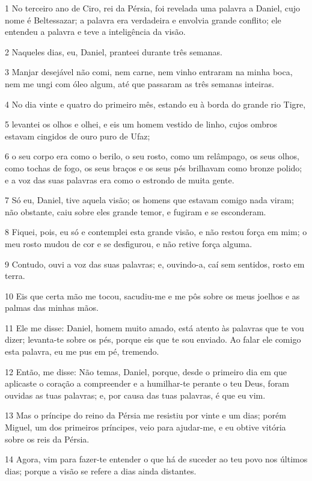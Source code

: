 \par 1 No terceiro ano de Ciro, rei da Pérsia, foi revelada uma palavra a Daniel, cujo nome é Beltessazar; a palavra era verdadeira e envolvia grande conflito; ele entendeu a palavra e teve a inteligência da visão.
\par 2 Naqueles dias, eu, Daniel, pranteei durante três semanas.
\par 3 Manjar desejável não comi, nem carne, nem vinho entraram na minha boca, nem me ungi com óleo algum, até que passaram as três semanas inteiras.
\par 4 No dia vinte e quatro do primeiro mês, estando eu à borda do grande rio Tigre,
\par 5 levantei os olhos e olhei, e eis um homem vestido de linho, cujos ombros estavam cingidos de ouro puro de Ufaz;
\par 6 o seu corpo era como o berilo, o seu rosto, como um relâmpago, os seus olhos, como tochas de fogo, os seus braços e os seus pés brilhavam como bronze polido; e a voz das suas palavras era como o estrondo de muita gente.
\par 7 Só eu, Daniel, tive aquela visão; os homens que estavam comigo nada viram; não obstante, caiu sobre eles grande temor, e fugiram e se esconderam.
\par 8 Fiquei, pois, eu só e contemplei esta grande visão, e não restou força em mim; o meu rosto mudou de cor e se desfigurou, e não retive força alguma.
\par 9 Contudo, ouvi a voz das suas palavras; e, ouvindo-a, caí sem sentidos, rosto em terra.
\par 10 Eis que certa mão me tocou, sacudiu-me e me pôs sobre os meus joelhos e as palmas das minhas mãos.
\par 11 Ele me disse: Daniel, homem muito amado, está atento às palavras que te vou dizer; levanta-te sobre os pés, porque eis que te sou enviado. Ao falar ele comigo esta palavra, eu me pus em pé, tremendo.
\par 12 Então, me disse: Não temas, Daniel, porque, desde o primeiro dia em que aplicaste o coração a compreender e a humilhar-te perante o teu Deus, foram ouvidas as tuas palavras; e, por causa das tuas palavras, é que eu vim.
\par 13 Mas o príncipe do reino da Pérsia me resistiu por vinte e um dias; porém Miguel, um dos primeiros príncipes, veio para ajudar-me, e eu obtive vitória sobre os reis da Pérsia.
\par 14 Agora, vim para fazer-te entender o que há de suceder ao teu povo nos últimos dias; porque a visão se refere a dias ainda distantes.
